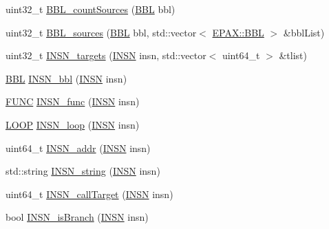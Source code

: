 \begin{DoxyCompactItemize}
\item 
uint32\-\_\-t \hyperlink{namespace_e_p_a_x_aa23a09b89b8217fde08a9969c60a315c}{\-B\-B\-L\-\_\-count\-Sources} (\hyperlink{namespace_e_p_a_x_a0ad4f6573b03fa5c375bed0e68d4fab0}{\-B\-B\-L} bbl)
\item 
uint32\-\_\-t \hyperlink{namespace_e_p_a_x_a343520ef70235a8d8885c3ea5dddcfb3}{\-B\-B\-L\-\_\-sources} (\hyperlink{namespace_e_p_a_x_a0ad4f6573b03fa5c375bed0e68d4fab0}{\-B\-B\-L} bbl, std\-::vector$<$ \hyperlink{namespace_e_p_a_x_a0ad4f6573b03fa5c375bed0e68d4fab0}{\-E\-P\-A\-X\-::\-B\-B\-L} $>$ \&bbl\-List)
\item 
uint32\-\_\-t \hyperlink{namespace_e_p_a_x_a614cdfc7733f9ba151a7be30277808c4}{\-I\-N\-S\-N\-\_\-targets} (\hyperlink{namespace_e_p_a_x_a601da5f2ead9a877d566da6cfc9026eb}{\-I\-N\-S\-N} insn, std\-::vector$<$ uint64\-\_\-t $>$ \&tlist)
\item 
\hyperlink{namespace_e_p_a_x_a0ad4f6573b03fa5c375bed0e68d4fab0}{\-B\-B\-L} \hyperlink{namespace_e_p_a_x_a50bbfd9bb7bc673f43c980bdfb33b6bc}{\-I\-N\-S\-N\-\_\-bbl} (\hyperlink{namespace_e_p_a_x_a601da5f2ead9a877d566da6cfc9026eb}{\-I\-N\-S\-N} insn)
\item 
\hyperlink{namespace_e_p_a_x_a5b05cc89d633ec2241cb3af828c03024}{\-F\-U\-N\-C} \hyperlink{namespace_e_p_a_x_a454c39a6a6075713f08d459276daf3c5}{\-I\-N\-S\-N\-\_\-func} (\hyperlink{namespace_e_p_a_x_a601da5f2ead9a877d566da6cfc9026eb}{\-I\-N\-S\-N} insn)
\item 
\hyperlink{namespace_e_p_a_x_ac236645423e99e8ccc784040ff1f881e}{\-L\-O\-O\-P} \hyperlink{namespace_e_p_a_x_aa1f4ced523c0a0cb562e877d46fdc8b1}{\-I\-N\-S\-N\-\_\-loop} (\hyperlink{namespace_e_p_a_x_a601da5f2ead9a877d566da6cfc9026eb}{\-I\-N\-S\-N} insn)
\item 
uint64\-\_\-t \hyperlink{namespace_e_p_a_x_a07290c51b68be1f32d0411e5c0f612dc}{\-I\-N\-S\-N\-\_\-addr} (\hyperlink{namespace_e_p_a_x_a601da5f2ead9a877d566da6cfc9026eb}{\-I\-N\-S\-N} insn)
\item 
std\-::string \hyperlink{namespace_e_p_a_x_a6606e3913aeb19f5d863723e6ae63e7f}{\-I\-N\-S\-N\-\_\-string} (\hyperlink{namespace_e_p_a_x_a601da5f2ead9a877d566da6cfc9026eb}{\-I\-N\-S\-N} insn)
\item 
uint64\-\_\-t \hyperlink{namespace_e_p_a_x_a9fb272028d299f7ce5c49e9e2f6d362b}{\-I\-N\-S\-N\-\_\-call\-Target} (\hyperlink{namespace_e_p_a_x_a601da5f2ead9a877d566da6cfc9026eb}{\-I\-N\-S\-N} insn)
\item 
bool \hyperlink{namespace_e_p_a_x_a52a202189d478fbc50c54ed887ef001f}{\-I\-N\-S\-N\-\_\-is\-Branch} (\hyperlink{namespace_e_p_a_x_a601da5f2ead9a877d566da6cfc9026eb}{\-I\-N\-S\-N} insn)

\end{DoxyCompactItemize}
